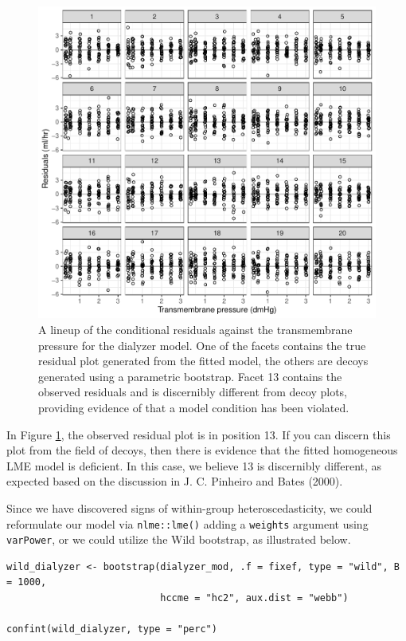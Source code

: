 \begin{figure}

{\centering \includegraphics{RJ-2023-015_files/figure-latex/lineup-1} 

}

\caption{A lineup of the conditional residuals against the transmembrane pressure for the dialyzer model. One of the facets contains the true residual plot generated from the fitted model, the others are decoys generated using a parametric bootstrap. Facet 13 contains the observed residuals and is discernibly different from decoy plots, providing evidence of that a model condition has been violated.}\label{fig:lineup}
\end{figure}

\noindent In Figure \ref{fig:lineup}, the observed residual plot is in position 13. If you can discern this plot from the field of decoys, then there is evidence that the fitted homogeneous LME model is deficient. In this case, we believe 13 is discernibly different, as expected based on the discussion in J. C. Pinheiro and Bates (2000).

Since we have discovered signs of within-group heteroscedasticity, we could reformulate our model via \texttt{nlme::lme()} adding a \texttt{weights} argument using \texttt{varPower}, or we could utilize the Wild bootstrap, as illustrated below.

\begin{verbatim}
wild_dialyzer <- bootstrap(dialyzer_mod, .f = fixef, type = "wild", B = 1000, 
                           hccme = "hc2", aux.dist = "webb")

confint(wild_dialyzer, type = "perc")
\end{verbatim}

